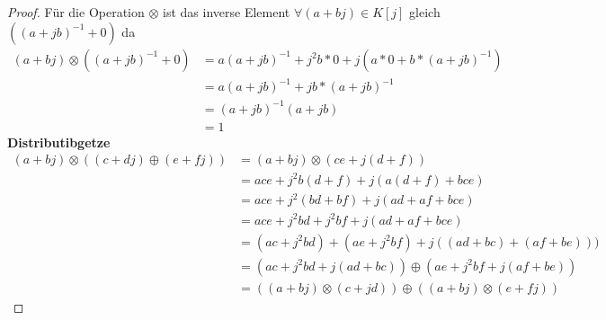 \documentclass{../problemset}
\begin{document}
\begin{problem}
\begin{proof}
	Für die Operation $\otimes$ ist das inverse Element $\forall (a + bj) \in K[j]$ gleich $({(a+jb)}^{-1}+0)$ da \begin{align}
		(a + bj) \otimes ({(a+jb)}^{-1}+0) & = a{(a+jb)}^{-1} + j^2b*0 + j(a*0 + b*{(a+jb)}^{-1}) \\
		                                   & = a{(a+jb)}^{-1} + jb*{(a+jb)}^{-1}                  \\
		                                   & = {(a+jb)}^{-1}(a + jb)                              \\
		                                   & = 1
	\end{align}
	\textbf{Distributibgetze} \\
	\begin{align}
		(a + bj) \otimes ((c + dj) \oplus (e + fj)) & = (a + bj) \otimes (ce + j(d + f))                               \\
		                                            & = ace + j^2b(d+f) + j(a(d+f) + bce)                              \\
		                                            & = ace + j^2(bd+bf) + j(ad+af + bce)                              \\
		                                            & = ace + j^2bd+j^2bf + j(ad+af + bce)                             \\
		                                            & = (ac + j^2bd) + (ae + j^2bf) + j((ad + bc) + (af + be)))        \\
		                                            & = (ac + j^2bd + j(ad + bc)) \oplus (ae + j^2bf + j(af + be))     \\
		                                            & = ((a + bj) \otimes (c + jd)) \oplus ((a + bj) \otimes (e + fj))
	\end{align}

\end{proof}


\end{problem}
\end{document}
